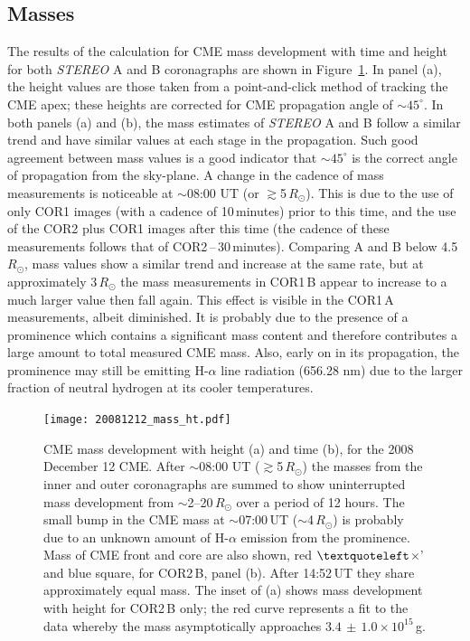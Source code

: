 \subsection{Masses}\label{sec:11}

The results of the calculation for CME mass development with time and height for both \emph{STEREO} A and B coronagraphs are shown in 
Figure~\ref{fig:20081212_mass_ht}. In panel (a), the height values are those taken from a point-and-click method of tracking the CME apex; these 
heights are corrected for CME propagation angle of $\sim$$45^{\circ}$.  In both panels (a) and (b), the mass estimates of \emph{STEREO} A and 
B follow a similar trend and have similar values at each stage in the propagation. Such good agreement between mass values is a good indicator 
that $\sim$$45^{\circ}$ is the correct angle of propagation from the sky-plane. A change in the cadence of mass measurements is noticeable at 
$\sim$08:00 UT (or $\gtrsim$5\,$R_{\odot}$). This is due to the use of only COR1 images (with a cadence of 10\,minutes) prior to this time, and 
the use of the COR2 plus COR1 images after this time (the cadence of these measurements follows that of COR2\,--\,30\,minutes). Comparing 
A and B below 4.5\,$R_{\odot}$, mass values show a similar trend and increase at the same rate, but at approximately 3\,$R_{\odot}$ the mass 
measurements in COR1\,B appear to increase to a much larger value then fall again. This effect is visible in the COR1\,A measurements, albeit 
diminished. It is probably due to the presence of a prominence which contains a significant mass content and therefore contributes a large amount
to total measured CME mass. Also, early on in its propagation, the prominence may still be emitting H-$\alpha$ line radiation (656.28 nm) due 
to the larger fraction of neutral hydrogen at its cooler temperatures.
\begin{figure}
\begin{center}
\texttt{[image: 20081212\_mass\_ht.pdf]}
\caption[CME mass as a function of height and time]{CME mass development with height (a) and time (b), for the 2008 December 12 CME. After $\sim$08:00 UT ($\gtrsim$5\,$R_{\odot}$) the 
masses from the inner and outer coronagraphs are summed to show uninterrupted 
mass development from $\sim$2--20\,$R_{\odot}$ over a period of 12 hours. The small bump in the 
CME mass at $\sim$07:00\,UT ($\sim$4\,$R_{\odot}$) is probably due to an unknown amount of H-$\alpha$ emission from the prominence. Mass of 
CME front and core are also shown, red $\textquoteleft$$\times$' and blue square, for COR2\,B, panel (b). After 14:52\,UT they share approximately 
equal mass. The inset of (a) shows mass development with height for COR2\,B only; the red curve represents a fit to the data whereby the mass 
asymptotically approaches $3.4\,\pm\,1.0\times10^{15}$\,g. }
\end{center}
\label{fig:20081212_mass_ht}
\end{figure}
